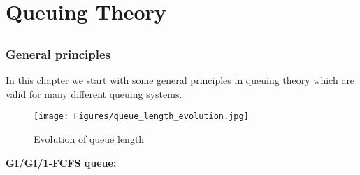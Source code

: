 \documentclass[all-lectures.tex]{subfiles}
\begin{document}

\setcounter{section}{1}
\setcounter{subsection}{1}
\chapter{Queuing Theory}
\section*{}
\subsection{General principles}
In this chapter we start with some general principles in queuing theory which are valid for many different queuing systems.\\ %

\begin{figure}
\centering
\texttt{[image: Figures/queue\_length\_evolution.jpg]}
\caption{Evolution of queue length}
\label{fig_queue_length_evolution}
\end{figure}
\textbf{GI/GI/1-FCFS queue:} 
\end{document}
